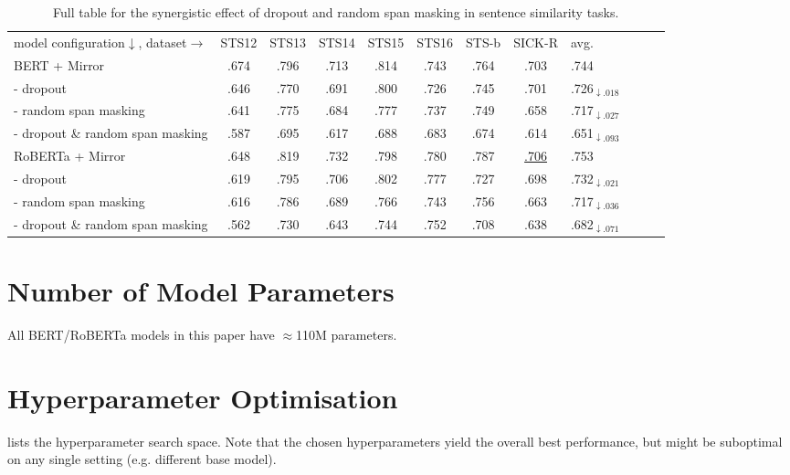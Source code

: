 \documentclass[11pt]{article}
\begin{document}
\begin{table*}[!htbp]
\centering
\small
\begin{tabular}{lccccccclccc}
\cmidrule[1.0pt]{1-10}
model configuration$\downarrow$, dataset$\rightarrow$ & STS12 & STS13 & STS14 & STS15 & STS16 & STS-b & SICK-R & avg.\\
\cmidrule[1.0pt]{1-10}
BERT + Mirror & .674 & .796 & .713 & .814 & .743 & .764 & .703 & .744 \\
\hdashline
- dropout & .646 & .770 & .691 & .800 & .726 & .745 & .701 & .726$_{\downarrow .018}$  \\
- random span masking & .641 & .775 & .684 & .777 & .737 & .749 & .658 & .717$_{\downarrow .027}$ \\
- dropout \& random span masking & .587 & .695 & .617 & .688 & .683 & .674 & .614 & .651$_{\downarrow .093}$ \\
\cmidrule[1.0pt]{1-10}
RoBERTa + Mirror & .648 & .819 & .732 & .798 & .780 & .787 & \underline{.706} & .753 \\
\hdashline
 - dropout & .619  & .795 & .706 & .802 & .777 & .727 & .698 & .732$_{\downarrow .021}$ \\
 - random span masking & .616 & .786 & .689 & .766 & .743 & .756 & .663 & .717$_{\downarrow .036}$ \\
 - dropout \& random span masking & .562 & .730 & .643 & .744 & .752 & .708 & .638 & .682$_{\downarrow .071}$ \\
\cmidrule[1.0pt]{1-10}
\end{tabular}
\caption{Full table for the synergistic effect of dropout and random span masking in sentence similarity tasks.}
\label{tab:synersitic_full}
\end{table*}



\section{Number of Model Parameters}\label{sec:appendix_number_param}
All BERT/RoBERTa models in this paper have $\approx$110M parameters.

\section{Hyperparameter Optimisation}\label{sec:hyperparameters}
 lists the hyperparameter search space. Note that the chosen hyperparameters yield the overall best performance, but might be suboptimal on any single setting (e.g. different base model). 
\end{document}
